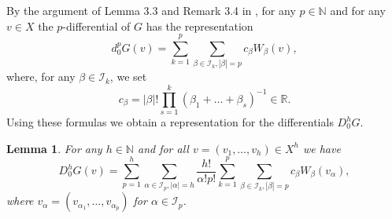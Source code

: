 \documentclass[12pt, reqno]{amsart}
\theoremstyle{plain}
\newtheorem {lemma}[theorem]{Lemma}
\theoremstyle{definition}
\theoremstyle{remark}
\numberwithin{equation}{section}
\newcommand{\R}{\mathbb{R}}
\newcommand{\N}{\mathbb{N}}
\newcommand{\I}{\mathcal{I}}
\newcommand{\oo}{\infty}
\newcommand{\0}{\theta}
\renewcommand{\a}{\alpha}
\renewcommand{\b}{\beta}
\newcommand{\1}{{-1}}
\renewcommand{\=}{\coloneqq}
\renewcommand{\.}{\dots}
\begin{document}
 

By  the   argument of Lemma 3.3 and Remark 3.4 in \cite{BMP20},   
for any $p\in \N$ and for any $v\in X$ the $p$-differential of $G$ has the representation
\begin{equation}
\label{luce}
 d_0^pG(v)=
 \sum_{k=1}^p\sum_{\b\in\I_k, |\b|=p}  c_\b   W_{	\b }(v),
\end{equation}
where, for any $\b\in\I_k$, we set  
\[
 c_\b = |\b| !  \prod_{s=1}^k(\b_1+\.+\b_s)^{-1}\in \R.
 \]
\noindent Using these formulas we obtain a representation for the differentials $D^h_0G$.
 

%
%
%
%
%

 


\begin{lemma} For any $h\in\N$ and for all 
 $ v=(v_1,\dots,v_h) \in X ^h$ we have
\begin{equation} \label{pluto}
 D_0^hG(v) =\sum_{p=1}^h\sum_{\a\in\I_p, |\a|=h}\frac{h!}{\a!p!}\sum_{k=1}^p\sum_{\b\in\I_k, |\b|=p}
  c_\b  W_\b( v_\a),
\end{equation}
where $v_\a=(v_{\a_1},\dots,v_{\a_p})$ for $\a\in \I_p$.

\end{lemma}
\end{document}
